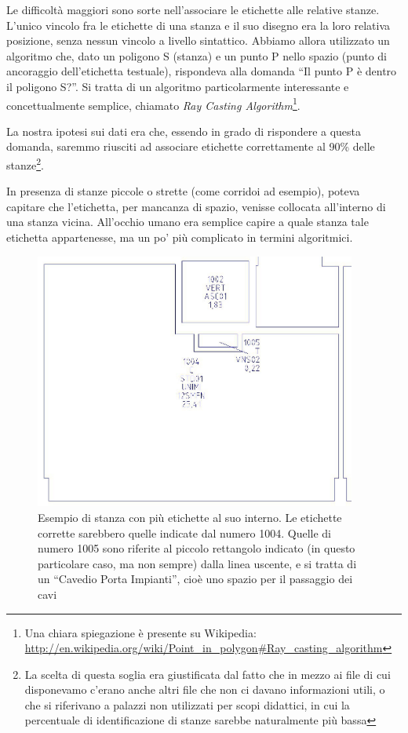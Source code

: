 \documentclass[12pt]{report}
\begin{document}
Le difficoltà maggiori sono sorte nell'associare le etichette alle relative stanze. L'unico vincolo fra le etichette di una stanza e il suo disegno era la loro relativa posizione, senza nessun vincolo a livello sintattico. Abbiamo allora utilizzato un algoritmo che, dato un poligono S (stanza) e un punto P nello spazio (punto di ancoraggio dell'etichetta testuale), rispondeva alla domanda ``Il punto P è dentro il poligono S?''. Si tratta di un algoritmo particolarmente interessante e concettualmente semplice, chiamato \textit{Ray Casting Algorithm}\footnote{Una chiara spiegazione è presente su Wikipedia: \url{http://en.wikipedia.org/wiki/Point_in_polygon\#Ray_casting_algorithm}}.

La nostra ipotesi sui dati era che, essendo in grado di rispondere a questa domanda, saremmo riusciti ad associare etichette correttamente al 90\% delle stanze\footnote{La scelta di questa soglia era giustificata dal fatto che in mezzo ai file di cui disponevamo c'erano anche altri file che non ci davano informazioni utili, o che si riferivano a palazzi non utilizzati per scopi didattici, in cui la percentuale di identificazione di stanze sarebbe naturalmente più bassa}.

In presenza di stanze piccole o strette (come corridoi ad esempio), poteva capitare che l'etichetta, per mancanza di spazio, venisse collocata all'interno di una stanza vicina. All'occhio umano era semplice capire a quale stanza tale etichetta appartenesse, ma un po' più complicato in termini algoritmici.

\begin{figure}[h]
    \centering
    \includegraphics[width=300pt]{03-dxf-stanza-etichette-fuori.jpg}
    \caption{Esempio di stanza con più etichette al suo interno. Le etichette corrette sarebbero quelle indicate dal numero 1004. Quelle di numero 1005 sono riferite al piccolo rettangolo indicato (in questo particolare caso, ma non sempre) dalla linea uscente, e si tratta di un ``Cavedio Porta Impianti'', cioè uno spazio per il passaggio dei cavi}
    \label{fig:dxf_chaos}
\end{figure}
\end{document}
